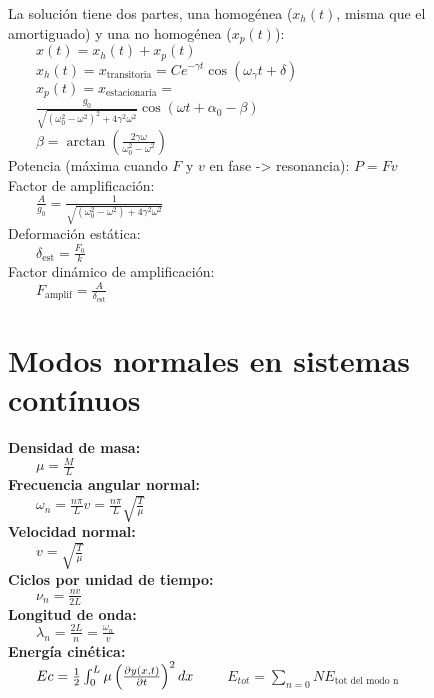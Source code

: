 \documentclass[a4paper,landscape,10pt]{cheatsheet}
\begin{document}
La solución tiene dos partes, una homogénea ($x_h(t)$, misma que el amortiguado) y una no homogénea ($x_p(t)$):\\
$\qquad x(t)=x_h(t)+x_p(t)$\\
$\qquad x_h(t)=x_\text{transitoria}=Ce^{-\gamma t}\cos\left(\omega_\gamma t+\delta\right)$\\
$\qquad x_p(t)=x_\text{estacionaria}=$\\
$\qquad \frac{g_0}{\sqrt{\left(\omega_0^2-\omega^2\right)^2+4\gamma^2\omega^2}}\cos\left(\omega t+\alpha_0-\beta\right)$\\
$\qquad \beta=\arctan\left(\frac{2\gamma\omega}{\omega_0^2-\omega^2}\right)$\\
Potencia (máxima cuando $F$ y $v$ en fase -> resonancia): $P=Fv$\\
Factor de amplificación: \\
$\qquad\frac{A}{g_0}=\frac{1}{\sqrt{\left(\omega_0^2-\omega^2\right)+4\gamma^2\omega^2}}$\\
Deformación estática: \\
$\qquad \delta_\text{est}=\frac{F_0}{k}$\\
Factor dinámico de amplificación: \\
$\qquad F_\text{amplif}=\frac{A}{\delta_\text{est}}$\\

\section{Modos normales en sistemas contínuos}
\textbf{Densidad de masa:} \\
$\qquad \mu=\frac{M}{L}$\\
\textbf{Frecuencia angular normal:}\\
$\qquad\omega_n=\frac{n\pi}{L}v=\frac{n\pi}{L}\sqrt{\frac{T}{\mu}}$\\
\textbf{Velocidad normal:} \\
$\qquad v=\sqrt{\frac{T}{\mu}}$\\
\textbf{Ciclos por unidad de tiempo:} \\
$\qquad \nu_n=\frac{nv}{2L}$\\
\textbf{Longitud de onda:} \\
$\qquad \lambda_n=\frac{2L}{n}=\frac{\omega_n}{v}$\\
\textbf{Energía cinética:}\\
$\qquad Ec=\frac{1}{2}\int_0^L{\mu\left(\pdv{y(x,t)}{t}\right)^2dx}$
$\qquad E_{tot}=\sum_{n=0}{N}E_{\text{tot del modo n}}$
\end{document}
